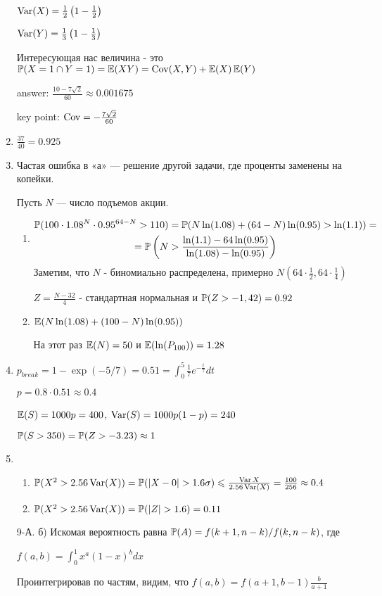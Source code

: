 \begin{enumerate}
$\Var(X)=\frac{1}{2}\left(1-\frac{1}{2}\right)$

$\Var(Y)=\frac{1}{3}\left(1-\frac{1}{3}\right)$

Интересующая нас величина - это $\P(X=1\cap Y=1)=\E(XY)=\Cov(X,Y)+\E(X)\E(Y)$

answer: $\frac{10-7\sqrt{2}}{60}\approx 0.001675$

key point: $\Cov=-\frac{7\sqrt{2}}{60}$
\item $\frac{37}{40}=0.925$
\item Частая ошибка в «а» — решение другой задачи, где проценты заменены на копейки.

Пусть $N$ — число подъемов акции.
\begin{enumerate}
\item
\begin{multline*}
\P(100\cdot 1.08^N\cdot 0.95^{64-N}>110)= \P(N \ln(1.08)+(64-N) \ln(0.95)> \ln(1.1))= \\
= \P\left(N>\frac{\ln(1.1)-64\ln(0.95)}{\ln(1.08)-\ln(0.95)}\right)
\end{multline*}
Заметим, что $N$ - биномиально распределена, примерно $N\left(64\cdot\frac{1}{2},64\cdot\frac{1}{4}\right)$

$Z=\frac{N-32}{4}$ - стандартная нормальная и $\P(Z>-1,42)=0.92$
\item $\E(N\ln(1.08)+(100-N)\ln(0.95))$

На этот раз $\E(N)=50$ и $\E(\ln(P_{100}))=1.28$
\end{enumerate}
\item $p_{break}=1-\exp(-5/7)=0.51=\int_{0}^{5}\frac{1}{7}e^{-\frac{t}{7}}dt$

$p=0.8\cdot 0.51\approx 0.4$

$\E(S)=1000p=400$, $\Var(S)=1000p(1-p)=240$

$\P(S>350)=\P(Z>-3.23)\approx 1$
\item
\begin{enumerate}
\item $\P(X^{2}>2.56\Var(X))=\P(|X-0|>1.6\sigma)\le
\frac{\Var{X}}{2.56\Var(X)}=\frac{100}{256}\approx 0.4$
\item $\P(X^{2}>2.56\Var(X))=\P(|Z|>1.6)=0.11$
\end{enumerate}
\item[9-А.] б) Искомая вероятность равна $\P(A)=f(k+1,n-k)/f(k,n-k)$, где

$f(a,b)=\int_{0}^{1}x^{a}(1-x)^{b}dx$

Проинтегрировав по частям, видим, что $f(a,b)=f(a+1,b-1)\frac{b}{a+1}$


\end{enumerate}
